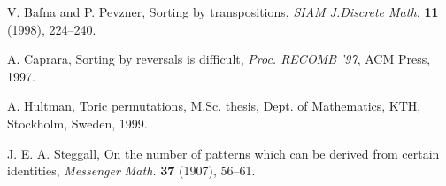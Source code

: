 \documentclass[11pt]{amsart} %
\begin{document}
\begin{thebibliography}{ABC}

 V. Bafna and P. Pevzner, Sorting by transpositions,
{\em SIAM J.Discrete Math.} {\bf 11 } (1998), 224--240.

 A. Caprara, Sorting by reversals is difficult, {\em Proc.
RECOMB '97}, ACM Press, 1997.

 A. Hultman, Toric permutations, M.Sc. thesis,
Dept. of Mathematics, KTH, Stockholm, Sweden, 1999.

 J. E. A. Steggall, On the number of patterns which can be
derived from certain identities,
{\em Messenger Math.} {\bf 37 } (1907), 56--61.

\end{thebibliography}
\end{document}
